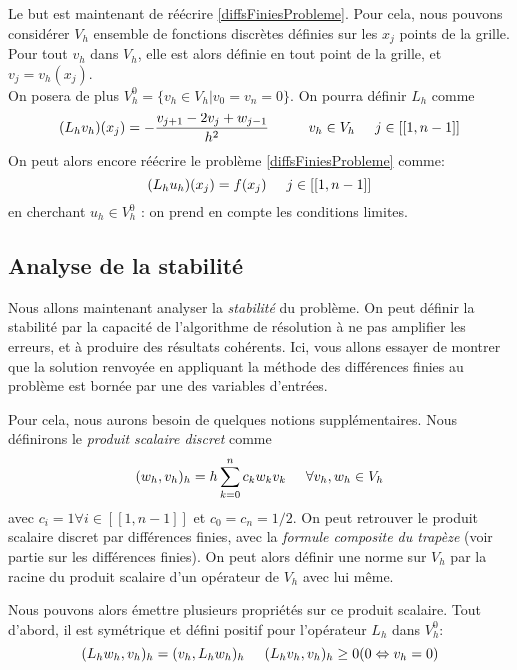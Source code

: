 \documentclass[12pt]{article}
\newcommand{\espace}{\hspace{5mm}}
\begin{document}
Le but est maintenant de réécrire \eqref{diffsFiniesProbleme}. Pour cela, nous pouvons considérer $V_h$ ensemble de fonctions discrètes définies sur les $x_j$ points de la grille. Pour tout $v_h$ dans $V_h$, elle est alors définie en tout point de la grille, et $v_j = v_h(x_j)$.\\ On posera de plus $V_h^0 = \{v_h \in V_h | v_0 = v_n = 0\}$.
On pourra définir $L_h$ comme
\begin{equation} \label{notationvj}
	(L_h v_h)(x_j) = - \frac{v_{j+1} - 2v_j + w_{j-1}}{h^2} \espace \espace v_h \in V_h \espace j \in [[1, n-1]]
\end{equation}
On peut alors encore réécrire le problème \eqref{diffsFiniesProbleme} comme:
\begin{equation} \label{diffFiniesAvecL}
	(L_h u_h)(x_j) = f(x_j) \espace j \in [[1, n-1]]
\end{equation}
en cherchant $u_h \in V_h^0$ : on prend en compte les conditions limites.

\subsection{Analyse de la stabilité}
Nous allons maintenant analyser la \emph{stabilité} du problème. On peut définir la stabilité par la capacité de l'algorithme de résolution à ne pas amplifier les erreurs, et à produire des résultats cohérents. Ici, vous allons essayer de montrer que la solution renvoyée en appliquant la méthode des différences finies au problème est bornée par une des variables d'entrées.

Pour cela, nous aurons besoin de quelques notions supplémentaires. Nous définirons le \emph{produit scalaire discret} comme
\begin{equation} \label{produitScalaireDiscret}
	(w_h, v_h)_h = h \sum_{k = 0}^n c_k w_k v_k \espace \forall v_h, w_h \in V_h
\end{equation}
avec $c_i= 1 \forall i \in [[1, n-1]]$ et $c_0 = c_n = 1/2$. On peut retrouver le produit scalaire discret par différences finies, avec la \emph{formule composite du trapèze} (voir partie sur les différences finies). On peut alors définir une norme sur $V_h$ par la racine du produit scalaire d'un opérateur de $V_h$ avec lui même.

Nous pouvons alors émettre plusieurs propriétés sur ce produit scalaire. Tout d'abord, il est symétrique et défini positif pour l'opérateur $L_h$ dans $V_h^0$:
\begin{equation}
	(L_h w_h, v_h)_h = (v_h, L_h w_h)_h \espace (L_h v_h, v_h)_h \ge 0 (0 \Leftrightarrow v_h = 0)
\end{equation}
\end{document}
